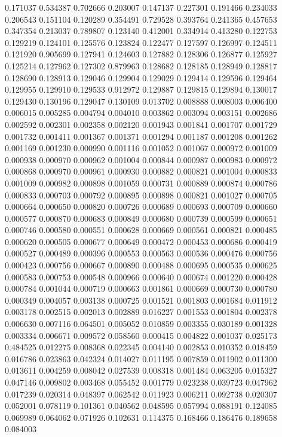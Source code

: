 0.171037
0.534387
0.702666
0.203007
0.147137
0.227301
0.191466
0.234033
0.206543
0.151104
0.120289
0.354491
0.729528
0.393764
0.241365
0.457653
0.347354
0.213037
0.789807
0.123140
0.412001
0.334914
0.413280
0.122753
0.129219
0.124101
0.125576
0.123824
0.122477
0.127597
0.126997
0.124511
0.121920
0.905699
0.127941
0.124603
0.127882
0.128306
0.126877
0.125927
0.125214
0.127962
0.127302
0.879963
0.128682
0.128185
0.128949
0.128817
0.128690
0.128913
0.129046
0.129904
0.129029
0.129414
0.129596
0.129464
0.129955
0.129910
0.129533
0.912972
0.129887
0.129815
0.129894
0.130017
0.129430
0.130196
0.129047
0.130109
0.013702
0.008888
0.008003
0.006400
0.006015
0.005285
0.004794
0.004010
0.003862
0.003094
0.003151
0.002686
0.002592
0.002301
0.002358
0.002120
0.001943
0.001841
0.001707
0.001729
0.001732
0.001411
0.001367
0.001371
0.001294
0.001187
0.001208
0.001262
0.001169
0.001230
0.000990
0.001116
0.001052
0.001067
0.000972
0.001009
0.000938
0.000970
0.000962
0.001004
0.000844
0.000987
0.000983
0.000972
0.000868
0.000970
0.000961
0.000930
0.000882
0.000821
0.001004
0.000833
0.001009
0.000982
0.000898
0.001059
0.000731
0.000889
0.000874
0.000786
0.000833
0.000703
0.000792
0.000895
0.000898
0.000821
0.001027
0.000705
0.000664
0.000650
0.000820
0.000726
0.000689
0.000693
0.000709
0.000660
0.000577
0.000870
0.000683
0.000849
0.000680
0.000739
0.000599
0.000651
0.000746
0.000580
0.000551
0.000628
0.000669
0.000561
0.000821
0.000485
0.000620
0.000505
0.000677
0.000649
0.000472
0.000453
0.000686
0.000419
0.000527
0.000489
0.000396
0.000553
0.000563
0.000536
0.000476
0.000756
0.000423
0.000756
0.000667
0.000890
0.000488
0.000695
0.000535
0.000625
0.000583
0.000753
0.000548
0.000966
0.000640
0.000674
0.001220
0.000428
0.000784
0.001044
0.000719
0.000663
0.001861
0.000669
0.000730
0.000780
0.000349
0.004057
0.003138
0.000725
0.001521
0.001803
0.001684
0.011912
0.003178
0.002515
0.002013
0.002889
0.016227
0.001553
0.001804
0.002378
0.006630
0.007116
0.064501
0.005052
0.010859
0.003355
0.030189
0.001328
0.003334
0.006671
0.009572
0.058560
0.000415
0.004822
0.001037
0.025173
0.484525
0.012275
0.008368
0.022345
0.004140
0.002853
0.010352
0.018459
0.016786
0.023863
0.042324
0.014027
0.011195
0.007859
0.011902
0.011300
0.013611
0.004259
0.008042
0.027539
0.008318
0.001484
0.063205
0.015327
0.047146
0.009802
0.003468
0.055452
0.001779
0.023238
0.039723
0.047962
0.017239
0.020314
0.048397
0.062542
0.011923
0.006211
0.092738
0.020307
0.052001
0.078119
0.101361
0.040562
0.048595
0.057994
0.088191
0.124085
0.069989
0.064062
0.071926
0.102631
0.114375
0.168466
0.186476
0.189658
0.084003
